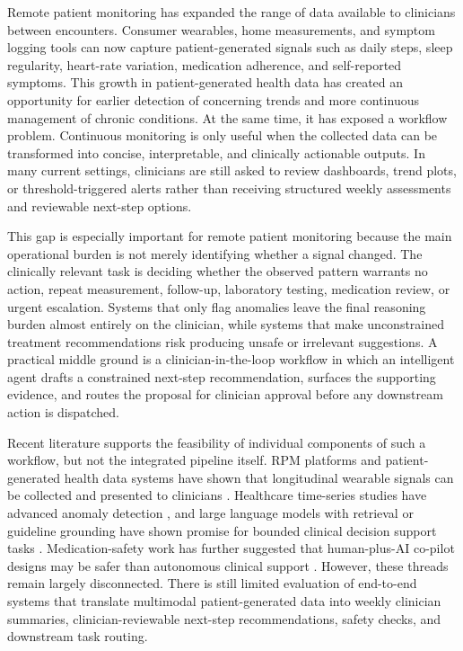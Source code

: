 \documentclass[conference]{IEEEtran}
\begin{document}
Remote patient monitoring has expanded the range of data available to clinicians between encounters. Consumer wearables, home measurements, and symptom logging tools can now capture patient-generated signals such as daily steps, sleep regularity, heart-rate variation, medication adherence, and self-reported symptoms. This growth in patient-generated health data has created an opportunity for earlier detection of concerning trends and more continuous management of chronic conditions. At the same time, it has exposed a workflow problem. Continuous monitoring is only useful when the collected data can be transformed into concise, interpretable, and clinically actionable outputs. In many current settings, clinicians are still asked to review dashboards, trend plots, or threshold-triggered alerts rather than receiving structured weekly assessments and reviewable next-step options.

This gap is especially important for remote patient monitoring because the main operational burden is not merely identifying whether a signal changed. The clinically relevant task is deciding whether the observed pattern warrants no action, repeat measurement, follow-up, laboratory testing, medication review, or urgent escalation. Systems that only flag anomalies leave the final reasoning burden almost entirely on the clinician, while systems that make unconstrained treatment recommendations risk producing unsafe or irrelevant suggestions. A practical middle ground is a clinician-in-the-loop workflow in which an intelligent agent drafts a constrained next-step recommendation, surfaces the supporting evidence, and routes the proposal for clinician approval before any downstream action is dispatched.

Recent literature supports the feasibility of individual components of such a workflow, but not the integrated pipeline itself. RPM platforms and patient-generated health data systems have shown that longitudinal wearable signals can be collected and presented to clinicians \cite{arun2024remotehealthconnect,activeDCM2024,ye2024pghd}. Healthcare time-series studies have advanced anomaly detection \cite{khanizadeh2025anomaly,ferrara2024wearable}, and large language models with retrieval or guideline grounding have shown promise for bounded clinical decision support tasks \cite{oniani2024guidelines,li2025garg,prabha2025adaptive}. Medication-safety work has further suggested that human-plus-AI co-pilot designs may be safer than autonomous clinical support \cite{ong2025medsafety}. However, these threads remain largely disconnected. There is still limited evaluation of end-to-end systems that translate multimodal patient-generated data into weekly clinician summaries, clinician-reviewable next-step recommendations, safety checks, and downstream task routing.
\end{document}
